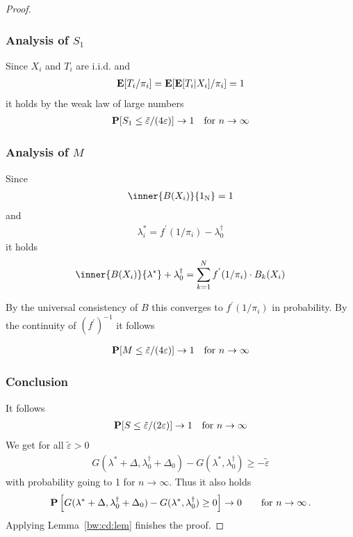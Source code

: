 \begin{proof}
 \subsubsection*{Analysis of $S_1$}
 Since
 $X_i$ and $T_i$ are i.i.d. 
 and
 \begin{gather}
   \mathbf{E}[
  T_i
  /
  \pi_i
   ]
   =
   \mathbf{E}[
   \mathbf{E}[
  T_i
  |X_i
   ]
  /
  \pi_i
   ]
   =1
 \end{gather}
 it holds by the weak law of large numbers
 \begin{gather}
   \P[S_1\le 
   \tilde{\varepsilon}/(4\varepsilon)
   ]\to 1
   \quad
   \text{for}\ 
   n\to \infty
 \end{gather}
 \subsubsection*{Analysis of $M$}
 Since  
 \begin{gather}
   \inner{B(X_i)}{\mathrm{1_N}}=1
 \end{gather}
 and
 \begin{gather}
   \lambda^*_i
   =
  f^{'}(1/\pi_i)
  -
  \lambda^\dagger_0
 \end{gather}
 it holds
 \begin{gather}
       \inner
       {B(X_i)}
       {\lambda^*}
       +
      \lambda^\dagger_0
     =
    \sum_{k=1}^{N}  
  f^{'}(1/\pi_i)
  \cdot
       B_k(X_i)
 \end{gather}

By the universal consistency of $B$
this converges to $
f^{'}
(
1/\pi_i
)
$ in probability.
By the continuity of 
$
(
f^{'}
)^{-1}
$
it follows

 \begin{gather}
   \P[M\le 
   \tilde{\varepsilon}/(4\varepsilon)
   ]\to 1
   \quad
   \text{for}\ 
   n\to \infty
 \end{gather}
 \subsubsection*{Conclusion}
 It follows
 \begin{gather}
   \P[S\le
   \tilde{\varepsilon}/(2\varepsilon)
   ]\to 1
   \quad
   \text{for}\ 
   n\to \infty
 \end{gather}
We get
for all $\tilde{\varepsilon}>0$
\begin{gather}
   G
     (
     \lambda^*
      +
      \Delta
      ,
      \lambda^\dagger_0
      +
     \Delta_0
     )
     -
     G
     (
     \lambda^*,
      \lambda^\dagger_0
     )
     \ge
     -
     \tilde{\varepsilon}
\end{gather}
with probability going to 1 for $n\to \infty$.
Thus it also holds
\begin{gather}
  \P
  \left[ 
   G
     (
     \lambda^*
      +
      \Delta
      ,
      \lambda^\dagger_0
      +
     \Delta_0
     )
     -
     G
     (
     \lambda^*,
      \lambda^\dagger_0
     )
     \ge
     0
  \right]
  \to
  0
  \qquad
  \text{for}
  \ 
  n\to \infty
  \,.
\end{gather}
Applying Lemma~\ref{bw:cd:lem} finishes the proof.



\end{proof}

